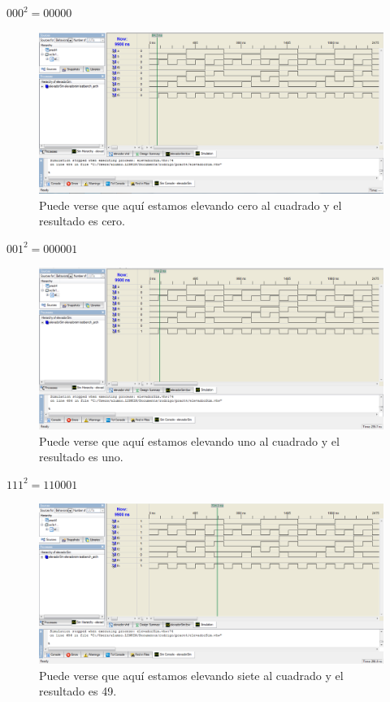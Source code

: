 \documentclass{mylib/reporteConCalif}
\begin{document}
$000^2 = 00000$
\begin{figure}[H]
	\centering
	\includegraphics[width=15cm]{img/labdise_pract4/r4_img2}
	\caption{Puede verse que aquí estamos elevando cero al cuadrado y el resultado es cero.}
\end{figure}

$001^2 = 000001$
\begin{figure}[H]
	\centering
	\includegraphics[width=15cm]{img/labdise_pract4/r4_img3}
	\caption{Puede verse que aquí estamos elevando uno al cuadrado y el resultado es uno.}
\end{figure}

$111^2 = 110001$
\begin{figure}[H]
	\centering
	\includegraphics[width=15cm]{img/labdise_pract4/r4_img4}
	\caption{Puede verse que aquí estamos elevando siete al cuadrado y el resultado es 49.}
\end{figure}
\end{document}
